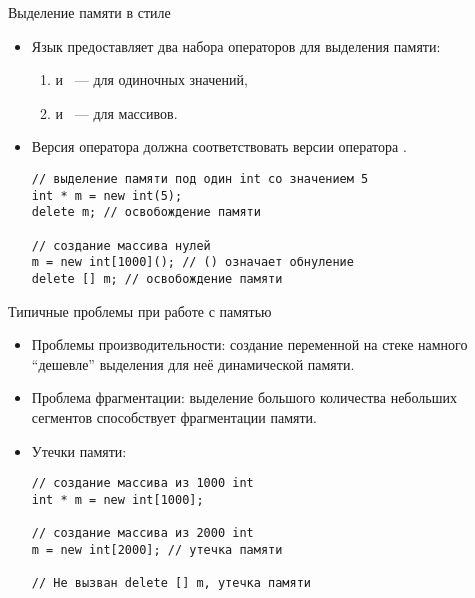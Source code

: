 \documentclass{beamer}
\begin{document}
\begin{frame}[fragile]{Выделение памяти в стиле \langcpp}
    \begin{itemize}
        \item Язык \langcpp предоставляет два набора операторов для
            выделения памяти:
            \begin{enumerate}
                \item {} и ~--- для одиночных значений,

                \item {} и ~--- для массивов.
            \end{enumerate}

        \item Версия оператора  должна соответствовать
            версии оператора .
\begin{lstlisting}
// выделение памяти под один int со значением 5
int * m = new int(5);
delete m; // освобождение памяти

// создание массива нулей
m = new int[1000](); // () означает обнуление 
delete [] m; // освобождение памяти
\end{lstlisting}
    \end{itemize}
\end{frame}

\begin{frame}[fragile]{Типичные проблемы при работе с памятью}
    \begin{itemize}
        \item Проблемы производительности: создание переменной на стеке
            намного ``дешевле'' выделения для неё динамической памяти.

        \item Проблема фрагментации: выделение большого количества
            небольших сегментов способствует фрагментации памяти.
        
        \item Утечки памяти:
\begin{lstlisting}
// создание массива из 1000 int    
int * m = new int[1000];

// создание массива из 2000 int    
m = new int[2000]; // утечка памяти

// Не вызван delete [] m, утечка памяти
\end{lstlisting}
    \end{itemize}
\end{frame}
\end{document}
